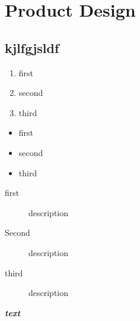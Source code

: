 \chapter{Product Design}
\label{chap:pd}

\section{kjlfgjsldf}

\begin{enumerate}
	\item first
	\item second
	\item third
\end{enumerate}

\begin{itemize}
	\item first 
	\item second
	\item third
\end{itemize}

\begin{description}
	\item[first] description
	\item[Second] description
	\item[third] description
\end{description}

\textbf{\textit{text}}